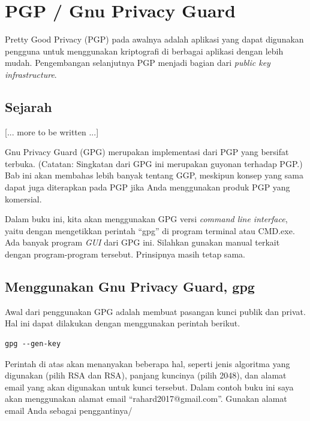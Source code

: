 \chapter{PGP / Gnu Privacy Guard}
Pretty Good Privacy (PGP) pada awalnya adalah aplikasi yang dapat digunakan
pengguna untuk menggunakan kriptografi di berbagai aplikasi dengan lebih mudah.
Pengembangan selanjutnya PGP menjadi bagian dari {\em public key
infrastructure}.

\section{Sejarah}
[... more to be written ...]

Gnu Privacy Guard (GPG) merupakan implementasi dari PGP yang bersifat terbuka.
(Catatan: Singkatan dari GPG ini merupakan guyonan terhadap PGP.) Bab ini akan
membahas lebih banyak tentang GGP, meskipun konsep yang sama dapat juga
diterapkan pada PGP jika Anda menggunakan produk PGP yang komersial.

Dalam buku ini, kita akan menggunakan GPG versi {\em command line interface},
yaitu dengan mengetikkan perintah ``gpg'' di program terminal atau CMD.exe.
Ada banyak program {\em GUI} dari GPG ini. Silahkan gunakan manual terkait
dengan program-program tersebut. Prinsipnya masih tetap sama.

\section{Menggunakan Gnu Privacy Guard, gpg}
Awal dari penggunakan GPG adalah membuat pasangan kunci publik dan privat. Hal
ini dapat dilakukan dengan menggunakan perintah berikut.

\begin{verbatim}
gpg --gen-key
\end{verbatim}

Perintah di atas akan menanyakan beberapa hal, seperti jenis algoritma yang
digunakan (pilih RSA dan RSA), panjang kuncinya (pilih 2048), dan alamat email
yang akan digunakan untuk kunci tersebut. Dalam contoh buku ini saya akan
menggunakan alamat email ``rahard2017@gmail.com''. Gunakan alamat email Anda
sebagai penggantinya/

